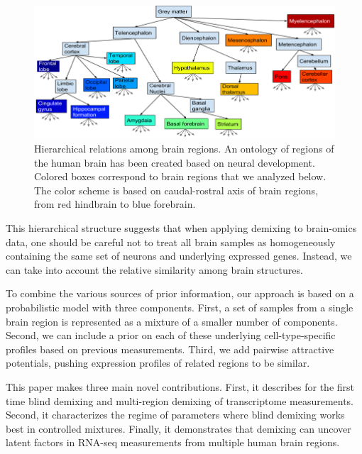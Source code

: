 \documentclass{article} %
\begin{document}
\begin{figure}[!hbt]
  \begin{minipage}[c]{0.63\textwidth}
    \includegraphics[width=\textwidth]{tree}
  \end{minipage}\hfill
  \begin{minipage}[c]{0.35\textwidth}
    \caption{Hierarchical relations among brain regions. An ontology of regions of the human brain has been created based on neural development. Colored boxes correspond to brain regions that we analyzed below. The color scheme is based on caudal-rostral axis of brain regions, from red hindbrain to blue forebrain.} 
    \label{fig:bro}
  \end{minipage}
\end{figure}

This hierarchical structure suggests that when applying demixing to brain-omics data, one should be careful not to treat all brain samples as homogeneously containing the same set of neurons and underlying expressed genes. Instead, we can take into account the relative similarity among brain structures. 

To combine the various sources of prior information, our approach is based on a probabilistic model with three components. First, a set of samples from a single brain region is represented as a mixture of a smaller number of components. Second, we can include a prior on each of these underlying cell-type-specific profiles based on previous measurements. Third, we add pairwise attractive potentials, pushing expression profiles of related regions to be similar.
 
This paper makes three main novel contributions. First, it describes for the first time blind demixing and multi-region demixing of transcriptome measurements. Second, it characterizes the regime of parameters where blind demixing works best in controlled mixtures. Finally, it demonstrates that demixing can uncover latent factors in RNA-seq measurements from multiple human brain regions.
 
\end{document}

